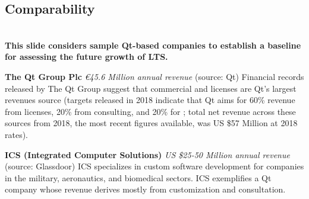 
\begin{frame}{}
\section{Comparability}
\vspace{.5em}	

{\Large%
\hspace*{-2pt}\begin{minipage}{\textwidth}
\vspace{4pt}


		


{\hspace{1.5em}\begin{minipage}[l]{.9\textwidth}\Large\centering\color{slidePartHeadColor} 	
{}\\\vspace{1em}
{\LARGE \textbf{This slide considers sample Qt-based companies to establish a baseline for assessing 
	the future growth of LTS.}}
\vspace{.7em}	
\end{minipage}}
\vspace{.1em}

{\LARGE \setlength{\leftmargini}{30pt}\begin{enumerate}
\dmitem \textbf{The Qt Group Plc} 
\textit{\euro{}45.6 Million annual revenue} (source: Qt)
Financial records released by The Qt Group suggest that commercial 
 and  licenses 
are Qt's largest revenues source (targets 
released in 2018 indicate that Qt  
aims for 60\% revenue from licenses, 20\% from 
consulting, and 20\% for ; 
total net revenue across these sources from 2018, 
the most recent figures available, was 
US \$57 Million at 2018 rates).\vspace{10pt}

\dmitem \textbf{ICS (Integrated Computer Solutions)} 
\textit{US \$25-50 Million annual revenue} (source: Glassdoor)
ICS specializes in custom software development 
for companies in the military, aeronautics, and 
biomedical sectors.  ICS exemplifies a 
Qt company whose revenue derives mostly from 
customization and consultation.\vspace{10pt}


\end{enumerate}}
\end{minipage}}
\end{frame}
